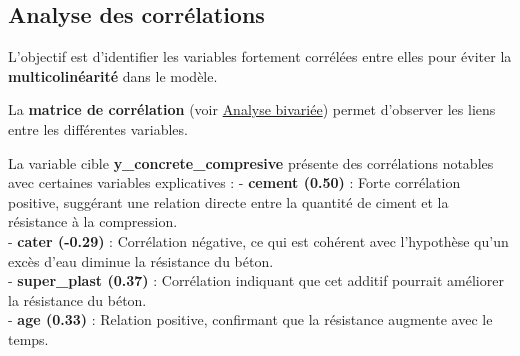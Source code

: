 \documentclass[
  12pt,
]{article}
\newenvironment{Shaded}{\begin{snugshade}}{\end{snugshade}}
\newcommand{\CommentTok}[1]{\textcolor[rgb]{0.56,0.35,0.01}{\textit{#1}}}
\newcommand{\FloatTok}[1]{\textcolor[rgb]{0.00,0.00,0.81}{#1}}
\newcommand{\FunctionTok}[1]{\textcolor[rgb]{0.13,0.29,0.53}{\textbf{#1}}}
\newcommand{\NormalTok}[1]{#1}
\newcommand{\OtherTok}[1]{\textcolor[rgb]{0.56,0.35,0.01}{#1}}
\newcommand{\SpecialCharTok}[1]{\textcolor[rgb]{0.81,0.36,0.00}{\textbf{#1}}}
\begin{document}
\begin{Shaded}
\end{Shaded}

\subsection{Analyse des corrélations}\label{analyse-des-corruxe9lations}

L'objectif est d'identifier les variables fortement corrélées entre
elles pour éviter la \textbf{multicolinéarité} dans le modèle.

La \textbf{matrice de corrélation} (voir
\hyperref[matrice-de-correlation]{Analyse bivariée}) permet d'observer
les liens entre les différentes variables.

La variable cible \textbf{y\_concrete\_compresive} présente des
corrélations notables avec certaines variables explicatives : -
\textbf{cement (0.50)} : Forte corrélation positive, suggérant une
relation directe entre la quantité de ciment et la résistance à la
compression.\\
- \textbf{cater (-0.29)} : Corrélation négative, ce qui est cohérent
avec l'hypothèse qu'un excès d'eau diminue la résistance du béton.\\
- \textbf{super\_plast (0.37)} : Corrélation indiquant que cet additif
pourrait améliorer la résistance du béton.\\
- \textbf{age (0.33)} : Relation positive, confirmant que la résistance
augmente avec le temps.
\end{document}
